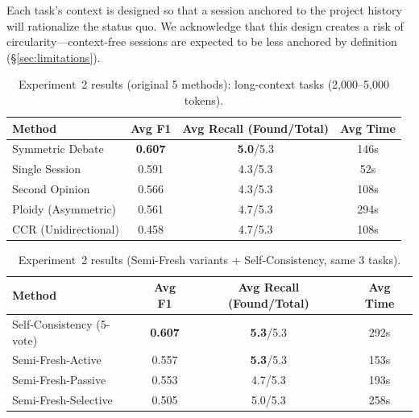 \documentclass[11pt]{article}
\begin{document}
Each task's context is designed so that a session anchored to the project history will rationalize the status quo. We acknowledge that this design creates a risk of circularity---context-free sessions are expected to be less anchored by definition (\S\ref{sec:limitations}).

\begin{table}[t]
\centering
\caption{Experiment~2 results (original 5 methods): long-context tasks (2,000--5,000 tokens).}
\label{tab:exp2}
\small
\begin{tabular}{@{}lccc@{}}
\toprule
\textbf{Method} & \textbf{Avg F1} & \textbf{Avg Recall (Found/Total)} & \textbf{Avg Time} \\
\midrule
Symmetric Debate       & \textbf{0.607} & \textbf{5.0}/5.3 & 146s \\
Single Session         & 0.591          & 4.3/5.3            & 52s  \\
Second Opinion         & 0.566          & 4.3/5.3            & 108s \\
Ploidy (Asymmetric)    & 0.561          & 4.7/5.3            & 294s \\
CCR (Unidirectional)   & 0.458          & 4.7/5.3            & 108s \\
\bottomrule
\end{tabular}
\end{table}

\begin{table}[t]
\centering
\caption{Experiment~2 results (Semi-Fresh variants + Self-Consistency, same 3 tasks).}
\label{tab:exp2-sf}
\small
\begin{tabular}{@{}lccc@{}}
\toprule
\textbf{Method} & \textbf{Avg F1} & \textbf{Avg Recall (Found/Total)} & \textbf{Avg Time} \\
\midrule
Self-Consistency (5-vote) & \textbf{0.607} & \textbf{5.3}/5.3 & 292s \\
Semi-Fresh-Active         & 0.557          & \textbf{5.3}/5.3 & 153s \\
Semi-Fresh-Passive        & 0.553          & 4.7/5.3            & 193s \\
Semi-Fresh-Selective      & 0.505          & 5.0/5.3            & 258s \\
\bottomrule
\end{tabular}
\end{table}
\end{document}
